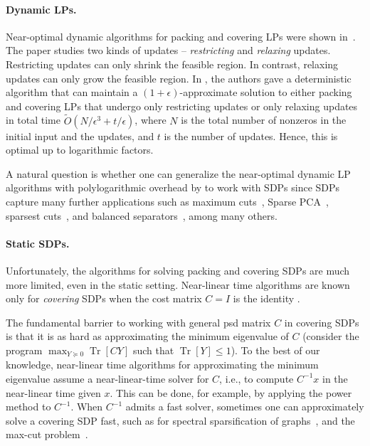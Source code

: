 \documentclass[11pt]{article}
\DeclareMathOperator{\Tr}{Tr}
\newcommand\xx{\boldsymbol{\mathit{x}}}
\newcommand\CC{\boldsymbol{\mathit{C}}}
\newcommand\II{\boldsymbol{\mathit{I}}}
\newcommand\YY{\boldsymbol{\mathit{Y}}}
\newcommand\Otil{\widetilde{O}}
\begin{document}
\paragraph{Dynamic LPs.}
Near-optimal dynamic algorithms for packing and covering LPs were shown in~\cite{bhattacharya2023dynamic}. The paper studies two kinds of updates -- {\it restricting} and {\it relaxing} updates.
Restricting updates can only shrink the feasible region. In contrast, relaxing updates can only grow the feasible region.
In \cite{bhattacharya2023dynamic}, the authors gave a deterministic algorithm that can maintain a $(1+\epsilon)$-approximate solution to either packing and covering LPs that undergo only restricting updates or only relaxing updates in total time $\Otil(N/\epsilon^3 + t/\epsilon)$, where $N$ is the total number of nonzeros in the initial input and the updates, and $t$ is the number of updates. Hence, this is optimal up to logarithmic factors. 

A natural question is whether one can generalize the near-optimal dynamic LP algorithms with polylogarithmic overhead by \cite{bhattacharya2023dynamic} to work with SDPs since SDPs capture many further applications such as maximum cuts~\cite{iyengar2011approximating,klein1996efficient}, Sparse PCA~\cite{iyengar2011approximating}, sparsest cuts~\cite{iyengar2010feasible}, and  balanced separators~\cite{orecchia2012approximating}, among many others.

\paragraph{Static SDPs.}
Unfortunately, the algorithms for solving packing and covering SDPs are much more limited, even in the static setting. Near-linear time algorithms are known only for \emph{covering} SDPs when the cost matrix $\CC = \II$ is the identity \cite{peng2012faster,allen2016using}. 

The fundamental barrier to working with general psd matrix $\CC$ in covering SDPs is that it is as hard as approximating the minimum eigenvalue of $\CC$ (consider the program $\max_{\YY\succeq 0} \Tr[\CC\YY]$ such that $\Tr[\YY]\leq 1$). To the best of our knowledge, near-linear time algorithms for approximating the minimum eigenvalue assume a near-linear-time solver for $\CC$, i.e., to compute $\CC^{-1}\xx$ in the near-linear time given $\xx$. This can be done, for example, by applying the power method to $\CC^{-1}$. When $\CC^{-1}$ admits a fast solver, sometimes one can approximately solve a covering SDP fast, such as for spectral sparsification of graphs~\cite{lee2017sdp}, and the max-cut problem~\cite{arora2007combinatorial,trevisan2009max}.
\end{document}
